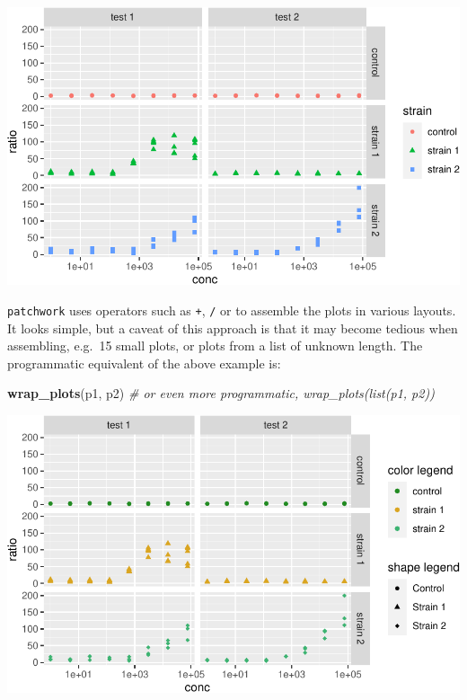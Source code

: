 \documentclass[]{book}
\newenvironment{Shaded}{}{}
\newcommand{\CommentTok}[1]{\textcolor[rgb]{0.38,0.63,0.69}{\textit{#1}}}
\newcommand{\KeywordTok}[1]{\textcolor[rgb]{0.00,0.44,0.13}{\textbf{#1}}}
\newcommand{\NormalTok}[1]{#1}
\begin{document}
\begin{center}\includegraphics[width=\textwidth]{TRES-Tidy-Tutorial_files/figure-latex/unnamed-chunk-148-1} \end{center}

\texttt{patchwork} uses operators such as \texttt{+}, \texttt{/} or \texttt{\textbar{}} to assemble the plots in various layouts. It looks simple, but a caveat of this approach is that it may become tedious when assembling, e.g.~15 small plots, or plots from a list of unknown length. The programmatic equivalent of the above example is:

\begin{Shaded}
\begin{Highlighting}[]
\KeywordTok{wrap_plots}\NormalTok{(p1, p2) }\CommentTok{# or even more programmatic, wrap_plots(list(p1, p2))}
\end{Highlighting}
\end{Shaded}

\begin{center}\includegraphics[width=\textwidth]{TRES-Tidy-Tutorial_files/figure-latex/unnamed-chunk-149-1} \end{center}
\end{document}
